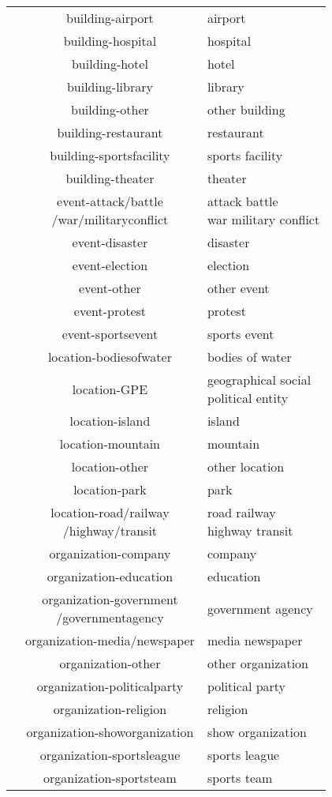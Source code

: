 \documentclass[11pt]{article}
\begin{document}
\begin{table}[htb]
\begin{center}
{\begin{tabular}{lcl}
    &building-airport & airport \\
    &building-hospital & hospital \\
    &building-hotel & hotel \\
    &building-library & library \\
    &building-other & other building \\
    &building-restaurant & restaurant \\
    &building-sportsfacility & sports facility \\
    &building-theater & theater \\
    &\makecell[c]{event-attack/battle\\/war/militaryconflict} & \makecell[l]{attack battle \\war military conflict} \\
    &event-disaster & disaster \\
    &event-election & election \\
    &event-other & other event \\
    &event-protest & protest \\
    &event-sportsevent & sports event \\
    &location-bodiesofwater & bodies of water \\
    &location-GPE & \makecell[l]{geographical social \\political entity} \\
    &location-island & island \\
    &location-mountain & mountain \\
    &location-other & other location \\
    &location-park & park \\
    &\makecell[c]{location-road/railway\\/highway/transit} & \makecell[l]{road railway \\highway transit} \\
    &organization-company & company \\
    &organization-education & education \\
    &\makecell[c]{organization-government\\/governmentagency} & government agency \\
    &organization-media/newspaper & media newspaper \\
    &organization-other & other organization \\
    &organization-politicalparty & political party \\
    &organization-religion & religion \\
    &organization-showorganization & show organization \\
    &organization-sportsleague & sports league \\
    &organization-sportsteam & sports team \\




\end{tabular}}
\end{center}
\end{table}
\end{document}
